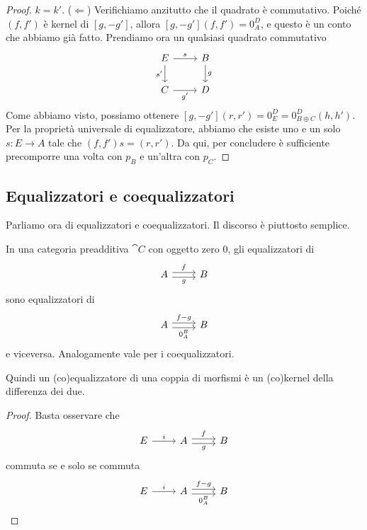 \begin{proof}
  \(k = k'\).\newline
  (\(\Leftarrow\)) Verifichiamo anzitutto che il quadrato è
  commutativo. Poiché \((f, f')\) è kernel di \([g, -g']\), allora
  \([g, -g'] (f, f') = 0_A^D\), e questo è un conto che abbiamo già
  fatto. Prendiamo ora un qualsiasi quadrato commutativo
  \[
    \begin{tikzcd}
      E \ar["{s}", r] \ar["{s'}", d, swap] & B \ar["{g}", d] \\
      C \ar["{g'}", r, swap] & D
    \end{tikzcd}
  \]
  Come abbiamo visto, possiamo ottenere
  \([g, -g'] (r, r') = 0_E^D = 0_{B \oplus C}^D (h, h')\). Per la
  proprietà universale di equalizzatore, abbiamo che esiste uno e un
  solo \(s : E \to A\) tale che \((f, f') s = (r, r')\). Da qui, per
  concludere è sufficiente precomporre una volta con \(p_B\) e un'altra
  con \(p_C\). %
\end{proof}


\subsection{Equalizzatori e coequalizzatori}

Parliamo ora di equalizzatori e coequalizzatori. Il discorso è piuttosto
semplice.

\begin{proposition}\label{proposition:EqualizersAreKernels}
  In una categoria preadditiva \(\cat C\) con oggetto zero \(0\), gli
  equalizzatori di
  \[
    \begin{tikzcd}
      A \ar["f", r, shift left] \ar["g", r, shift right, swap] & B
    \end{tikzcd}
  \]
  sono equalizzatori di
  \[
    \begin{tikzcd}
      A \ar["{f-g}", r, shift left] \ar["{0_A^B}", r, shift right, swap]
      & B
    \end{tikzcd}
  \]
  e viceversa. Analogamente vale per i coequalizzatori.
\end{proposition}

Quindi un (co)equalizzatore di una coppia di morfismi è un (co)kernel
della differenza dei due.

\begin{proof}
  Basta osservare che
  \[
    \begin{tikzcd}
      E \ar["i", r] & A \ar["f", r, shift left] \ar["g", r, shift right,
      swap] & B
    \end{tikzcd}
  \]
  commuta se e solo se commuta
  \[
    \begin{tikzcd}
      E \ar["i", r] & A \ar["{f-g}", r, shift left] \ar["{0_A^B}", r,
      shift right, swap] & B
    \end{tikzcd}
    \qedhere\]
\end{proof}



